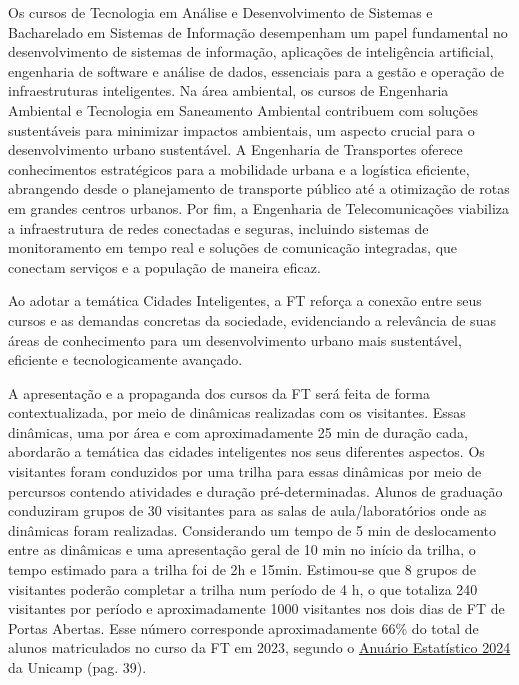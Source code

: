 \documentclass[
  letterpaper,
  DIV=11,
  numbers=noendperiod]{scrreprt}
\begin{document}
Os cursos de Tecnologia em Análise e Desenvolvimento de Sistemas e
Bacharelado em Sistemas de Informação desempenham um papel fundamental
no desenvolvimento de sistemas de informação, aplicações de inteligência
artificial, engenharia de software e análise de dados, essenciais para a
gestão e operação de infraestruturas inteligentes. Na área ambiental, os
cursos de Engenharia Ambiental e Tecnologia em Saneamento Ambiental
contribuem com soluções sustentáveis para minimizar impactos ambientais,
um aspecto crucial para o desenvolvimento urbano sustentável. A
Engenharia de Transportes oferece conhecimentos estratégicos para a
mobilidade urbana e a logística eficiente, abrangendo desde o
planejamento de transporte público até a otimização de rotas em grandes
centros urbanos. Por fim, a Engenharia de Telecomunicações viabiliza a
infraestrutura de redes conectadas e seguras, incluindo sistemas de
monitoramento em tempo real e soluções de comunicação integradas, que
conectam serviços e a população de maneira eficaz.

Ao adotar a temática Cidades Inteligentes, a FT reforça a conexão entre
seus cursos e as demandas concretas da sociedade, evidenciando a
relevância de suas áreas de conhecimento para um desenvolvimento urbano
mais sustentável, eficiente e tecnologicamente avançado.

A apresentação e a propaganda dos cursos da FT será feita de forma
contextualizada, por meio de dinâmicas realizadas com os visitantes.
Essas dinâmicas, uma por área e com aproximadamente 25 min de duração
cada, abordarão a temática das cidades inteligentes nos seus diferentes
aspectos. Os visitantes foram conduzidos por uma trilha para essas
dinâmicas por meio de percursos contendo atividades e duração
pré-determinadas. Alunos de graduação conduziram grupos de 30 visitantes
para as salas de aula/laboratórios onde as dinâmicas foram realizadas.
Considerando um tempo de 5 min de deslocamento entre as dinâmicas e uma
apresentação geral de 10 min no início da trilha, o tempo estimado para
a trilha foi de 2h e 15min. Estimou-se que 8 grupos de visitantes
poderão completar a trilha num período de 4 h, o que totaliza 240
visitantes por período e aproximadamente 1000 visitantes nos dois dias
de FT de Portas Abertas. Esse número corresponde aproximadamente 66\% do
total de alunos matriculados no curso da FT em 2023, segundo o
\href{https://aeplan.unicamp.br/wp-content/uploads/sites/5/2024/05/anuario-2024.pdf}{Anuário
Estatístico 2024} da Unicamp (pag. 39).
\end{document}
